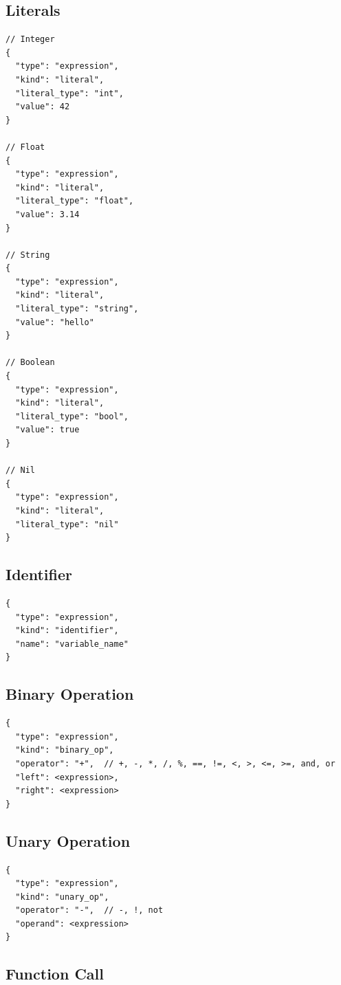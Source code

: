 \subsection{Literals}

\begin{lstlisting}[language={}]
// Integer
{
  "type": "expression",
  "kind": "literal",
  "literal_type": "int",
  "value": 42
}

// Float
{
  "type": "expression",
  "kind": "literal",
  "literal_type": "float",
  "value": 3.14
}

// String
{
  "type": "expression",
  "kind": "literal",
  "literal_type": "string",
  "value": "hello"
}

// Boolean
{
  "type": "expression",
  "kind": "literal",
  "literal_type": "bool",
  "value": true
}

// Nil
{
  "type": "expression",
  "kind": "literal",
  "literal_type": "nil"
}
\end{lstlisting}

\subsection{Identifier}

\begin{lstlisting}[language={}]
{
  "type": "expression",
  "kind": "identifier",
  "name": "variable_name"
}
\end{lstlisting}

\subsection{Binary Operation}

\begin{lstlisting}[language={}]
{
  "type": "expression",
  "kind": "binary_op",
  "operator": "+",  // +, -, *, /, %, ==, !=, <, >, <=, >=, and, or
  "left": <expression>,
  "right": <expression>
}
\end{lstlisting}

\subsection{Unary Operation}

\begin{lstlisting}[language={}]
{
  "type": "expression",
  "kind": "unary_op",
  "operator": "-",  // -, !, not
  "operand": <expression>
}
\end{lstlisting}

\subsection{Function Call}


